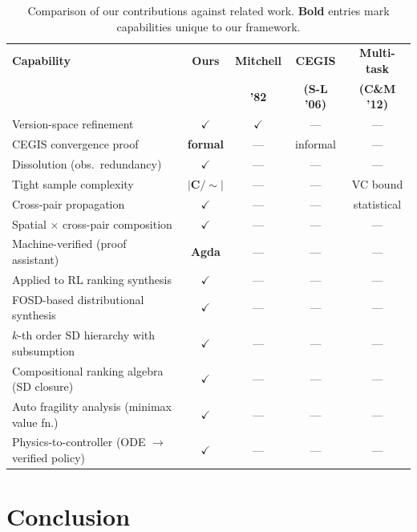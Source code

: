 \documentclass[9pt,a4paper]{article}
\theoremstyle{plain}
\theoremstyle{definition}
\theoremstyle{remark}
\begin{document}
\begin{table}[t]
\centering
\caption{Comparison of our contributions against related work.  \textbf{Bold} entries mark capabilities unique to our framework.}
\label{tab:related}
\small
\begin{tabular}{@{}lcccc@{}}
\textbf{Capability} & \textbf{Ours} & \textbf{Mitchell} & \textbf{CEGIS} & \textbf{Multi-task} \\
 & & \textbf{'82} & \textbf{(S-L '06)} & \textbf{(C\&M '12)} \\
\hline
Version-space refinement & $\checkmark$ & $\checkmark$ & --- & --- \\
CEGIS convergence proof & \textbf{formal} & --- & informal & --- \\
Dissolution (obs.\ redundancy) & $\boldsymbol{\checkmark}$ & --- & --- & --- \\
Tight sample complexity & $\boldsymbol{|C/{\sim}|}$ & --- & --- & VC bound \\
Cross-pair propagation & $\boldsymbol{\checkmark}$ & --- & --- & statistical \\
Spatial $\times$ cross-pair composition & $\boldsymbol{\checkmark}$ & --- & --- & --- \\
Machine-verified (proof assistant) & \textbf{Agda} & --- & --- & --- \\
Applied to RL ranking synthesis & $\boldsymbol{\checkmark}$ & --- & --- & --- \\
FOSD-based distributional synthesis & $\boldsymbol{\checkmark}$ & --- & --- & --- \\
$k$-th order SD hierarchy with subsumption & $\boldsymbol{\checkmark}$ & --- & --- & --- \\
Compositional ranking algebra (SD closure) & $\boldsymbol{\checkmark}$ & --- & --- & --- \\
Auto fragility analysis (minimax value fn.) & $\boldsymbol{\checkmark}$ & --- & --- & --- \\
Physics-to-controller (ODE $\to$ verified policy) & $\boldsymbol{\checkmark}$ & --- & --- & --- \\
\end{tabular}
\end{table}



\section{Conclusion}
\end{document}
